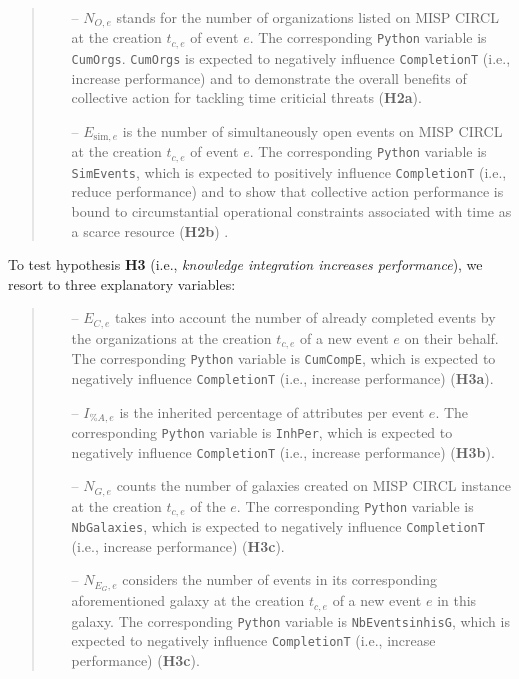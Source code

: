 \documentclass[unnumsec,webpdf,contemporary,large]{oup-authoring-template}%
\theoremstyle{thmstyleone}%
\theoremstyle{thmstyletwo}%
\theoremstyle{thmstylethree}%
\begin{document}
\begin{quote}
\begin{itemize}
\item[--]$N_{O,e}$ stands for the number of organizations listed on MISP CIRCL at the creation $t_{c,e}$ of event $e$. The corresponding \texttt{Python} variable is \texttt{CumOrgs}. \texttt{CumOrgs} is expected to negatively influence \texttt{CompletionT} (i.e., increase performance) and to demonstrate the overall benefits of collective action for tackling time criticial threats ({\bf H2a}). 
\item[--] $E_{\textrm{sim},e}$ is the number of simultaneously open events on MISP CIRCL at the creation $t_{c,e}$ of event $e$. The corresponding \texttt{Python} variable is \texttt{SimEvents}, which is expected to positively influence \texttt{CompletionT} (i.e., reduce performance) and to show that collective action performance is bound to circumstantial operational constraints associated with time as a scarce resource ({\bf H2b}) \cite{maillart_quantification_2011,kuypers_designing_2018}.
\end{itemize}
\end{quote}


To test hypothesis {\bf H3} (i.e., {\it knowledge integration increases performance}), we resort to three explanatory variables:


\begin{quote}
\begin{itemize}
    \item[--] $E_{C,e}$ takes into account the number of already completed events by the organizations at the creation $t_{c,e}$ of a new event $e$ on their behalf. The corresponding \texttt{Python} variable is \texttt{CumCompE}, which is expected to negatively influence \texttt{CompletionT} (i.e., increase performance) ({\bf H3a}).
    \item[--] $I_{{\%A},e}$ is the inherited percentage of attributes per event $e$. The corresponding \texttt{Python} variable is \texttt{InhPer}, which is expected to negatively influence \texttt{CompletionT} (i.e., increase performance) ({\bf H3b}).
    \item[--] $N_{G,e}$ counts the number of galaxies created on MISP CIRCL instance at the creation $t_{c,e}$ of the $e$. The corresponding \texttt{Python} variable is \texttt{NbGalaxies}, which is expected to negatively influence \texttt{CompletionT} (i.e., increase performance)  ({\bf H3c}). 
    \item[--] $N_{E_G,e}$ considers the number of events in its corresponding aforementioned galaxy at the creation $t_{c,e}$ of a new event $e$ in this galaxy. The corresponding \texttt{Python} variable is \texttt{NbEventsinhisG}, which is expected to negatively influence \texttt{CompletionT} (i.e., increase performance)  ({\bf H3c}).
\end{itemize}
\end{quote}
\end{document}
